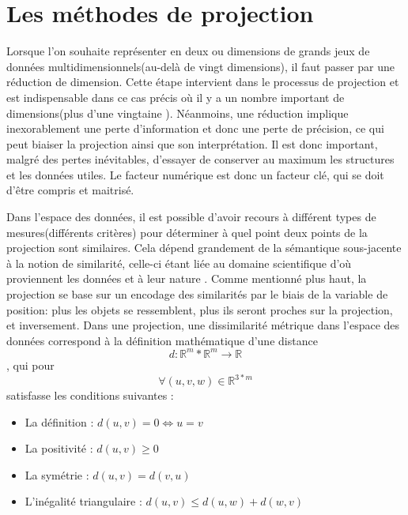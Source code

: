 \section{Les méthodes de projection}

Lorsque l'on souhaite représenter en deux ou  dimensions de grands jeux de données multidimensionnels(au-delà de vingt dimensions\cite{dzemyda2016big}\cite{HeulotThese}), il faut passer par une réduction de dimension. 
Cette étape intervient dans le processus de projection et est indispensable dans ce cas précis où il y a un nombre important de dimensions(plus d'une vingtaine \cite{HeulotThese}). 
Néanmoins, une réduction implique inexorablement une perte d’information et donc une perte de précision, ce qui peut biaiser la projection ainsi que son interprétation. Il est donc important, malgré des pertes inévitables, d'essayer de conserver au maximum les structures et les données utiles.
Le facteur numérique est donc un facteur clé, qui se doit d’être compris et maitrisé. 

\smallskip

Dans l'espace des données, il est possible d’avoir recours à différent types de mesures(différents critères) pour déterminer à quel point deux points de la projection sont similaires. 
Cela dépend grandement de la sémantique sous-jacente à la notion de similarité, celle-ci étant liée au domaine scientifique d’où proviennent les données et à leur nature \cite{HeulotThese}.
Comme mentionné plus haut, la projection se base sur un encodage des similarités par le biais de la variable de position: plus les objets se ressemblent, plus ils seront proches sur la projection, et inversement.
Dans une projection, une dissimilarité métrique dans l’espace des données correspond à la définition mathématique d’une distance \cite{somorjai2011Dissimilarity} \cite{HeulotThese} \newline
 \[d : \mathbb{R}^{m} * \mathbb{R}^{m} \rightarrow \mathbb{R} \] \newline
, qui pour \[\forall (u,v,w) \in \mathbb{R}^{3*m}\] satisfasse les conditions suivantes \cite{HeulotThese} : 
\begin{itemize}
    \item La définition : $d(u,v) = 0 \Leftrightarrow u =v$
    \item La positivité : $d(u,v)  \geq 0$
    \item La symétrie : $d(u,v) = d(v,u)$
    \item L'inégalité triangulaire : $d(u,v) \leq d(u,w) + d(w,v)$
\end{itemize}


